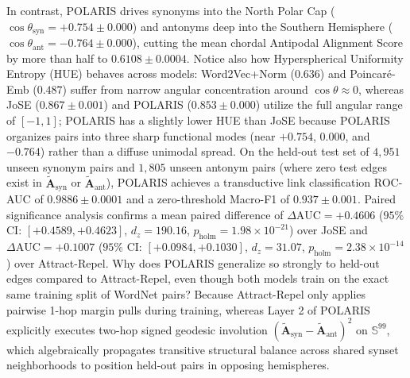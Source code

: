 \documentclass[journal]{IEEEtran}
\begin{document}
In contrast, POLARIS drives synonyms into the North Polar Cap ($\cos\theta_{\text{syn}} = +0.754 \pm 0.000$) and antonyms deep into the Southern Hemisphere ($\cos\theta_{\text{ant}} = -0.764 \pm 0.000$), cutting the mean chordal Antipodal Alignment Score by more than half to $0.6108 \pm 0.0004$. Notice also how Hyperspherical Uniformity Entropy (HUE) behaves across models: Word2Vec+Norm ($0.636$) and Poincar\'{e}-Emb ($0.487$) suffer from narrow angular concentration around $\cos\theta \approx 0$, whereas JoSE ($0.867 \pm 0.001$) and POLARIS ($0.853 \pm 0.000$) utilize the full angular range of $[-1, 1]$; POLARIS has a slightly lower HUE than JoSE because POLARIS organizes pairs into three sharp functional modes (near $+0.754$, $0.000$, and $-0.764$) rather than a diffuse unimodal spread. On the held-out test set of $4,951$ unseen synonym pairs and $1,805$ unseen antonym pairs (where zero test edges exist in $\tilde{\mathbf{A}}_{\text{syn}}$ or $\tilde{\mathbf{A}}_{\text{ant}}$), POLARIS achieves a transductive link classification ROC-AUC of $0.9886 \pm 0.0001$ and a zero-threshold Macro-F1 of $0.937 \pm 0.001$. Paired significance analysis confirms a mean paired difference of $\Delta\text{AUC} = +0.4606$ ($95\%$ CI: $[+0.4589, +0.4623]$, $d_z = 190.16$, $p_{\text{holm}} = 1.98 \times 10^{-21}$) over JoSE and $\Delta\text{AUC} = +0.1007$ ($95\%$ CI: $[+0.0984, +0.1030]$, $d_z = 31.07$, $p_{\text{holm}} = 2.38 \times 10^{-14}$) over Attract-Repel. Why does POLARIS generalize so strongly to held-out edges compared to Attract-Repel, even though both models train on the exact same training split of WordNet pairs? Because Attract-Repel only applies pairwise 1-hop margin pulls during training, whereas Layer 2 of POLARIS explicitly executes two-hop signed geodesic involution $(\tilde{\mathbf{A}}_{\text{syn}} - \tilde{\mathbf{A}}_{\text{ant}})^2$ on $\mathbb{S}^{99}$, which algebraically propagates transitive structural balance across shared synset neighborhoods to position held-out pairs in opposing hemispheres.

\begin{table}[!t]
\centering
\caption{Experiment 2: Word Similarity Evaluation on SimLex-999 Across 10 Seeds (Mean $\pm$ SD).}
\label{tab:exp2_simlex}
\end{table}
\end{document}
